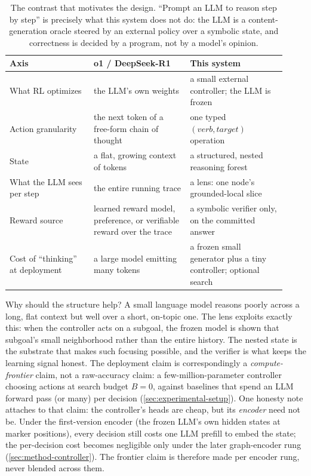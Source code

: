 \begin{table}[t]
\centering
\small
\begin{tabular}{@{}p{0.28\linewidth}p{0.32\linewidth}p{0.32\linewidth}@{}}
\toprule
Axis & o1 / DeepSeek-R1 & This system \\
\midrule
What RL optimizes & the LLM's own weights & a small external controller; the LLM is frozen \\
Action granularity & the next token of a free-form chain of thought & one typed $(\textit{verb}, \textit{target})$ operation \\
State & a flat, growing context of tokens & a structured, nested reasoning forest \\
What the LLM sees per step & the entire running trace & a lens: one node's grounded-local slice \\
Reward source & learned reward model, preference, or verifiable reward over the trace & a symbolic verifier only, on the committed answer \\
Cost of ``thinking'' at deployment & a large model emitting many tokens & a frozen small generator plus a tiny controller; optional search \\
\bottomrule
\end{tabular}
\caption{The contrast that motivates the design. ``Prompt an LLM to reason
step by step'' is precisely what this system does not do: the LLM is a
content-generation oracle steered by an external policy over a symbolic
state, and correctness is decided by a program, not by a model's opinion.}
\label{tab:contrast}
\end{table}

Why should the structure help? A small language model reasons poorly across
a long, flat context but well over a short, on-topic one. The lens exploits
exactly this: when the controller acts on a subgoal, the frozen model is
shown that subgoal's small neighborhood rather than the entire history. The
nested state is the substrate that makes such focusing possible, and the
verifier is what keeps the learning signal honest. The deployment claim is
correspondingly a \emph{compute-frontier} claim, not a raw-accuracy claim:
a few-million-parameter controller choosing actions at search budget
$B{=}0$, against baselines that spend an LLM forward pass (or many) per
decision (\cref{sec:experimental-setup}). One honesty note attaches to
that claim: the controller's heads are cheap, but its \emph{encoder} need
not be. Under the first-version encoder (the frozen LLM's own hidden
states at marker positions), every decision still costs one LLM prefill to
embed the state; the per-decision cost becomes negligible only under the
later graph-encoder rung (\cref{sec:method-controller}). The frontier
claim is therefore made per encoder rung, never blended across them.

